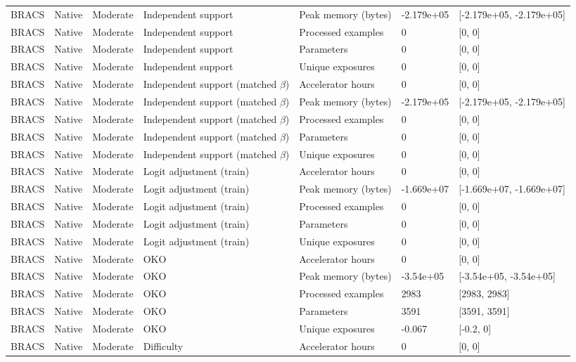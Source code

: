 \begin{longtable}{lllllll}
BRACS & Native & Moderate & Independent support & Peak memory (bytes) & -2.179e+05 & [-2.179e+05, -2.179e+05] \\
BRACS & Native & Moderate & Independent support & Processed examples & 0 & [0, 0] \\
BRACS & Native & Moderate & Independent support & Parameters & 0 & [0, 0] \\
BRACS & Native & Moderate & Independent support & Unique exposures & 0 & [0, 0] \\
BRACS & Native & Moderate & Independent support (matched $\beta$) & Accelerator hours & 0 & [0, 0] \\
BRACS & Native & Moderate & Independent support (matched $\beta$) & Peak memory (bytes) & -2.179e+05 & [-2.179e+05, -2.179e+05] \\
BRACS & Native & Moderate & Independent support (matched $\beta$) & Processed examples & 0 & [0, 0] \\
BRACS & Native & Moderate & Independent support (matched $\beta$) & Parameters & 0 & [0, 0] \\
BRACS & Native & Moderate & Independent support (matched $\beta$) & Unique exposures & 0 & [0, 0] \\
BRACS & Native & Moderate & Logit adjustment (train) & Accelerator hours & 0 & [0, 0] \\
BRACS & Native & Moderate & Logit adjustment (train) & Peak memory (bytes) & -1.669e+07 & [-1.669e+07, -1.669e+07] \\
BRACS & Native & Moderate & Logit adjustment (train) & Processed examples & 0 & [0, 0] \\
BRACS & Native & Moderate & Logit adjustment (train) & Parameters & 0 & [0, 0] \\
BRACS & Native & Moderate & Logit adjustment (train) & Unique exposures & 0 & [0, 0] \\
BRACS & Native & Moderate & OKO & Accelerator hours & 0 & [0, 0] \\
BRACS & Native & Moderate & OKO & Peak memory (bytes) & -3.54e+05 & [-3.54e+05, -3.54e+05] \\
BRACS & Native & Moderate & OKO & Processed examples & 2983 & [2983, 2983] \\
BRACS & Native & Moderate & OKO & Parameters & 3591 & [3591, 3591] \\
BRACS & Native & Moderate & OKO & Unique exposures & -0.067 & [-0.2, 0] \\
BRACS & Native & Moderate & Difficulty & Accelerator hours & 0 & [0, 0] \\

\end{longtable}
